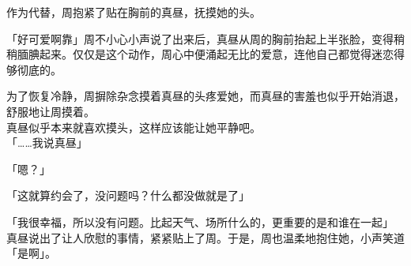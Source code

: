 作为代替，周抱紧了贴在胸前的真昼，抚摸她的头。

「好可爱啊靠」周不小心小声说了出来后，真昼从周的胸前抬起上半张脸，变得稍稍腼腆起来。仅仅是这个动作，周心中便涌起无比的爱意，连他自己都觉得迷恋得够彻底的。

为了恢复冷静，周摒除杂念摸着真昼的头疼爱她，而真昼的害羞也似乎开始消退，舒服地让周摸着。\\

真昼似乎本来就喜欢摸头，这样应该能让她平静吧。\\

「……我说真昼」

「嗯？」

「这就算约会了，没问题吗？什么都没做就是了」

「我很幸福，所以没有问题。比起天气、场所什么的，更重要的是和谁在一起」\\

真昼说出了让人欣慰的事情，紧紧贴上了周。于是，周也温柔地抱住她，小声笑道「是啊」。
